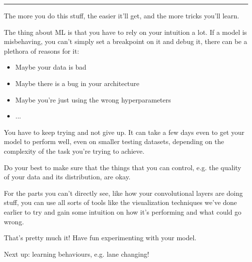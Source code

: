 \documentclass[
]{article}
\begin{document}
\begin{center}\rule{0.5\linewidth}{0.5pt}\end{center}

The more you do this stuff, the easier it'll get, and the more tricks
you'll learn.

The thing about ML is that you have to rely on your intuition a lot. If
a model is misbehaving, you can't simply set a breakpoint on it and
debug it, there can be a plethora of reasons for it:

\begin{itemize}
\item
  Maybe your data is bad
\item
  Maybe there is a bug in your architecture
\item
  Maybe you're just using the wrong hyperparameters
\item
  ...
\end{itemize}

You have to keep trying and not give up. It can take a few days even to
get your model to perform well, even on smaller testing datasets,
depending on the complexity of the task you're trying to achieve.

Do your best to make sure that the things that you can control, e.g. the
quality of your data and its distribution, are okay.

For the parts you can't directly see, like how your convolutional layers
are doing stuff, you can use all sorts of tools like the visualization
techniques we've done earlier to try and gain some intuition on how it's
performing and what could go wrong.

That's pretty much it! Have fun experimenting with your model.

Next up: learning behaviours, e.g. lane changing!
\end{document}
